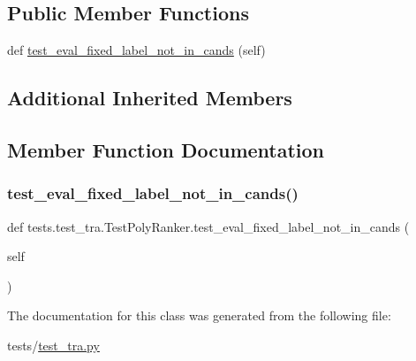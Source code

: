 \subsection*{Public Member Functions}
\begin{DoxyCompactItemize}
\item 
def \hyperlink{classtests_1_1test__tra_1_1TestPolyRanker_ae89dfeba6d9dab6d40cfed102ff26294}{test\+\_\+eval\+\_\+fixed\+\_\+label\+\_\+not\+\_\+in\+\_\+cands} (self)
\end{DoxyCompactItemize}
\subsection*{Additional Inherited Members}


\subsection{Member Function Documentation}
\mbox{\label{classtests_1_1test__tra_1_1TestPolyRanker_ae89dfeba6d9dab6d40cfed102ff26294}} 
\subsubsection{\texorpdfstring{test\+\_\+eval\+\_\+fixed\+\_\+label\+\_\+not\+\_\+in\+\_\+cands()}{test\_eval\_fixed\_label\_not\_in\_cands()}}
{\footnotesize\ttfamily def tests.\+test\+\_\+tra.\+Test\+Poly\+Ranker.\+test\+\_\+eval\+\_\+fixed\+\_\+label\+\_\+not\+\_\+in\+\_\+cands (\begin{DoxyParamCaption}\item[{}]{self }\end{DoxyParamCaption})}



The documentation for this class was generated from the following file\+:\begin{DoxyCompactItemize}
\item 
tests/\hyperlink{test__tra_8py}{test\+\_\+tra.\+py}\end{DoxyCompactItemize}

